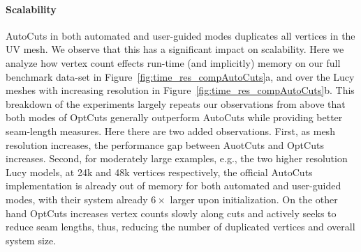 \paragraph{Scalability}
AutoCuts in both automated and user-guided modes duplicates all vertices in the UV mesh. We observe that this has a significant impact on scalability. Here we analyze how vertex count effects run-time (and implicitly) memory on our full benchmark data-set in Figure~\ref{fig:time_res_compAutoCuts}a, and over the Lucy meshes with increasing resolution in Figure~\ref{fig:time_res_compAutoCuts}b. This breakdown of the experiments largely repeats our observations from above that both modes of OptCuts generally outperform AutoCuts while providing better seam-length measures. Here there are two added observations. First, as mesh resolution increases, the performance gap between AuotCuts and OptCuts increases. Second, for moderately large examples, e.g., the two higher resolution Lucy models, at 24k and 48k vertices respectively, the official AutoCuts implementation is already out of memory for both automated and user-guided modes, with their system already $6\times$ larger upon initialization. On the other hand OptCuts increases vertex counts slowly along cuts and actively seeks to reduce seam lengths, thus, reducing the number of duplicated vertices and overall system size.



